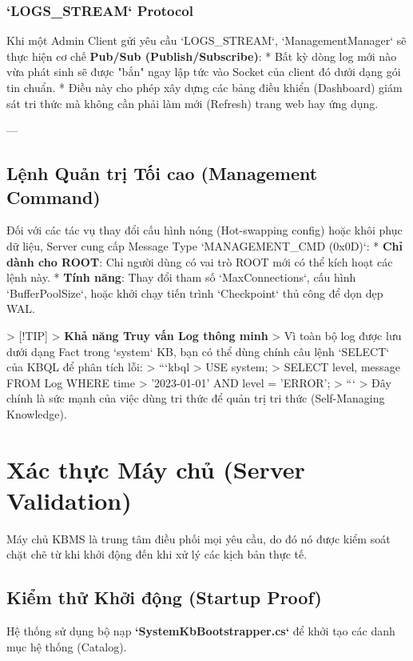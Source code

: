 \subsubsection{`LOGS_STREAM` Protocol}
Khi một Admin Client gửi yêu cầu `LOGS\_STREAM`, `ManagementManager` sẽ thực hiện cơ chế \textbf{Pub/Sub (Publish/Subscribe)}:
*   Bất kỳ dòng log mới nào vừa phát sinh sẽ được "bắn" ngay lập tức vào Socket của client đó dưới dạng gói tin chuẩn.
*   Điều này cho phép xây dựng các bảng điều khiển (Dashboard) giám sát tri thức mà không cần phải làm mới (Refresh) trang web hay ứng dụng.

---

\subsection{Lệnh Quản trị Tối cao (Management Command)}

Đối với các tác vụ thay đổi cấu hình nóng (Hot-swapping config) hoặc khôi phục dữ liệu, Server cung cấp Message Type `MANAGEMENT\_CMD (0x0D)`:
*   \textbf{Chỉ dành cho ROOT}: Chỉ người dùng có vai trò ROOT mới có thể kích hoạt các lệnh này.
*   \textbf{Tính năng}: Thay đổi tham số `MaxConnections`, cấu hình `BufferPoolSize`, hoặc khởi chạy tiến trình `Checkpoint` thủ công để dọn dẹp WAL.

> [!TIP]
> \textbf{Khả năng Truy vấn Log thông minh}
> Vì toàn bộ log được lưu dưới dạng Fact trong `system` KB, bạn có thể dùng chính câu lệnh `SELECT` của KBQL để phân tích lỗi:
> ```kbql
> USE system;
> SELECT level, message FROM Log WHERE time > '2023-01-01' AND level = 'ERROR';
> ```
> Đây chính là sức mạnh của việc dùng tri thức để quản trị tri thức (Self-Managing Knowledge).

\section{Xác thực Máy chủ (Server Validation)}

Máy chủ KBMS là trung tâm điều phối mọi yêu cầu, do đó nó được kiểm soát chặt chẽ từ khi khởi động đến khi xử lý các kịch bản thực tế.

\subsection{Kiểm thử Khởi động (Startup Proof)}

Hệ thống sử dụng bộ nạp \textbf{`SystemKbBootstrapper.cs`} để khởi tạo các danh mục hệ thống (Catalog).

